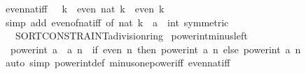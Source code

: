 \begin{isabellebody}
\isamarkupfalse%
\ even{\isacharunderscore}{\kern0pt}nat{\isacharunderscore}{\kern0pt}iff{\isacharcolon}{\kern0pt}\ {\isachardoublequoteopen}{}\ {\isasymle}\ k\ {\isasymLongrightarrow}\ even\ {\isacharparenleft}{\kern0pt}nat\ k{\isacharparenright}{\kern0pt}\ {\isasymlongleftrightarrow}\ even\ k{\isachardoublequoteclose}\isanewline
%
\isadelimproof
\ \ %
\endisadelimproof
%
\isatagproof
{}\isamarkupfalse%
\ {\isacharparenleft}{\kern0pt}simp\ add{\isacharcolon}{\kern0pt}\ even{\isacharunderscore}{\kern0pt}of{\isacharunderscore}{\kern0pt}nat{\isacharunderscore}{\kern0pt}iff\ {\isacharbrackleft}{\kern0pt}of\ {\isachardoublequoteopen}nat\ k{\isachardoublequoteclose}{\isacharcomma}{\kern0pt}\ \ {\isacharquery}{\kern0pt}{\isacharprime}{\kern0pt}a\ {\isacharequal}{\kern0pt}\ int{\isacharcomma}{\kern0pt}\ symmetric{\isacharbrackright}{\kern0pt}{\isacharparenright}{\kern0pt}%
\endisatagproof
{\isafoldproof}%
%
\isadelimproof
\isanewline
%
\endisadelimproof
\isanewline
{}\isamarkupfalse%
\isanewline
\ \ \ {\isachardoublequoteopen}SORT{\isacharunderscore}{\kern0pt}CONSTRAINT{\isacharparenleft}{\kern0pt}{\isacharprime}{\kern0pt}a{\isacharcolon}{\kern0pt}{\isacharcolon}{\kern0pt}division{\isacharunderscore}{\kern0pt}ring{\isacharparenright}{\kern0pt}{\isachardoublequoteclose}\isanewline
{}\isanewline
\isanewline
{}\isamarkupfalse%
\ power{\isacharunderscore}{\kern0pt}int{\isacharunderscore}{\kern0pt}minus{\isacharunderscore}{\kern0pt}left{\isacharcolon}{\kern0pt}\isanewline
\ \ {\isachardoublequoteopen}power{\isacharunderscore}{\kern0pt}int\ {\isacharparenleft}{\kern0pt}{\isacharminus}{\kern0pt}a\ {\isacharcolon}{\kern0pt}{\isacharcolon}{\kern0pt}\ {\isacharprime}{\kern0pt}a{\isacharparenright}{\kern0pt}\ n\ {\isacharequal}{\kern0pt}\ {\isacharparenleft}{\kern0pt}if\ even\ n\ then\ power{\isacharunderscore}{\kern0pt}int\ a\ n\ else\ {\isacharminus}{\kern0pt}power{\isacharunderscore}{\kern0pt}int\ a\ n{\isacharparenright}{\kern0pt}{\isachardoublequoteclose}\isanewline
%
\isadelimproof
\ \ %
\endisadelimproof
%
\isatagproof
{}\isamarkupfalse%
\ {\isacharparenleft}{\kern0pt}auto\ simp{\isacharcolon}{\kern0pt}\ power{\isacharunderscore}{\kern0pt}int{\isacharunderscore}{\kern0pt}def\ minus{\isacharunderscore}{\kern0pt}one{\isacharunderscore}{\kern0pt}power{\isacharunderscore}{\kern0pt}iff\ even{\isacharunderscore}{\kern0pt}nat{\isacharunderscore}{\kern0pt}iff{\isacharparenright}{\kern0pt}%
\endisatagproof
{\isafoldproof}%
%
\isadelimproof

\end{isabellebody}
